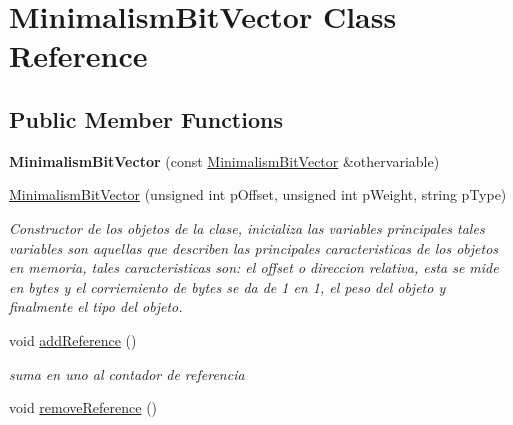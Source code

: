 \hypertarget{class_minimalism_bit_vector}{\section{Minimalism\-Bit\-Vector Class Reference}
\label{class_minimalism_bit_vector}
}
\subsection*{Public Member Functions}
\begin{DoxyCompactItemize}
\item 
\hypertarget{class_minimalism_bit_vector_a86a42058658485f11691aa7d73f89197}{{\bfseries Minimalism\-Bit\-Vector} (const \hyperlink{class_minimalism_bit_vector}{Minimalism\-Bit\-Vector} \&othervariable)}\label{class_minimalism_bit_vector_a86a42058658485f11691aa7d73f89197}

\item 
\hyperlink{class_minimalism_bit_vector_a62437d85d4a5bdf7bd519bfe1dd25847}{Minimalism\-Bit\-Vector} (unsigned int p\-Offset, unsigned int p\-Weight, string p\-Type)
\begin{DoxyCompactList}\small\item\em Constructor de los objetos de la clase, inicializa las variables principales tales variables son aquellas que describen las principales caracteristicas de los objetos en memoria, tales caracteristicas son\-: el offset o direccion relativa, esta se mide en bytes y el corriemiento de bytes se da de 1 en 1, el peso del objeto y finalmente el tipo del objeto. \end{DoxyCompactList}\item 
\hypertarget{class_minimalism_bit_vector_a77e8a538b975ae40aa2205e4bedb6d09}{void \hyperlink{class_minimalism_bit_vector_a77e8a538b975ae40aa2205e4bedb6d09}{add\-Reference} ()}\label{class_minimalism_bit_vector_a77e8a538b975ae40aa2205e4bedb6d09}

\begin{DoxyCompactList}\small\item\em suma en uno al contador de referencia \end{DoxyCompactList}\item 
\hypertarget{class_minimalism_bit_vector_ace33d25bceb2a3c4c2e2820650c37e10}{void \hyperlink{class_minimalism_bit_vector_ace33d25bceb2a3c4c2e2820650c37e10}{remove\-Reference} ()}\label{class_minimalism_bit_vector_ace33d25bceb2a3c4c2e2820650c37e10}


\end{DoxyCompactItemize}
